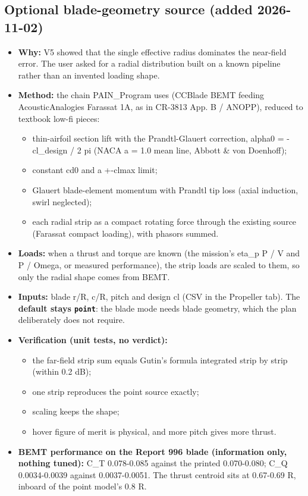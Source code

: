 \documentclass[10pt,a4paper]{article}
\begin{document}
\subsection*{Optional blade-geometry source (added 2026-11-02)}

\begin{itemize}
\item \textbf{Why:} V5 showed that the single effective radius dominates the near-field error. The user asked for a radial distribution built on a known pipeline rather than an invented loading shape.
\item \textbf{Method:} the chain PAIN\_Program uses (CCBlade BEMT feeding AcousticAnalogies Farassat 1A, as in CR-3813 App. B / ANOPP), reduced to textbook low-fi pieces:
\begin{itemize}
\item thin-airfoil section lift with the Prandtl-Glauert correction, alpha0 = -cl\_design / 2 pi (NACA a = 1.0 mean line, Abbott \& von Doenhoff);
\item constant cd0 and a +-clmax limit;
\item Glauert blade-element momentum with Prandtl tip loss (axial induction, swirl neglected);
\item each radial strip as a compact rotating force through the existing source (Farassat compact loading), with phasors summed.
\end{itemize}
\item \textbf{Loads:} when a thrust and torque are known (the mission's eta\_p P / V and P / Omega, or measured performance), the strip loads are scaled to them, so only the radial shape comes from BEMT.
\item \textbf{Inputs:} blade r/R, c/R, pitch and design cl (CSV in the Propeller tab). The \textbf{default stays \texttt{point}}: the blade mode needs blade geometry, which the plan deliberately does not require.
\item \textbf{Verification (unit tests, no verdict):}
\begin{itemize}
\item the far-field strip sum equals Gutin's formula integrated strip by strip (within 0.2 dB);
\item one strip reproduces the point source exactly;
\item scaling keeps the shape;
\item hover figure of merit is physical, and more pitch gives more thrust.
\end{itemize}
\item \textbf{BEMT performance on the Report 996 blade (information only, nothing tuned):} C\_T 0.078-0.085 against the printed 0.070-0.080; C\_Q 0.0034-0.0039 against 0.0037-0.0051. The thrust centroid sits at 0.67-0.69 R, inboard of the point model's 0.8 R.
\end{itemize}
\end{document}
